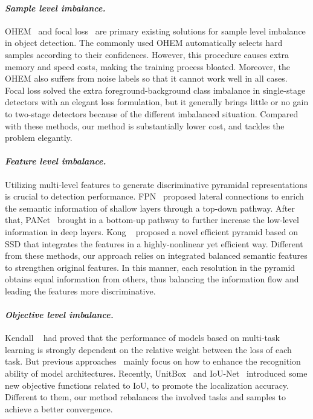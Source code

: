 \documentclass[10pt,twocolumn,letterpaper]{article}
\begin{document}
\paragraph{\emph{{Sample level imbalance.}}}
OHEM~\cite{ohem} and focal loss~\cite{focalloss} are primary existing solutions for sample level imbalance in object detection.
The commonly used OHEM automatically selects hard samples according to their confidences.
However, this procedure causes extra memory and speed costs, making the training process bloated.
Moreover, the OHEM also suffers from noise labels so that it cannot work well in all cases.
Focal loss solved the extra foreground-background class imbalance in single-stage detectors with an elegant loss formulation,
but it generally brings little or no gain to two-stage detectors because of the different imbalanced situation.
Compared with these methods, our method is substantially lower cost, and tackles the problem elegantly.

\vspace{-14pt}
\paragraph{\emph{{Feature level imbalance.}}}
Utilizing multi-level features to generate discriminative pyramidal representations is crucial to detection performance.
FPN~\cite{fpn} proposed lateral connections to enrich the semantic information of shallow layers through a top-down pathway.
After that, PANet~\cite{panet} brought in a bottom-up pathway to further increase the low-level information in deep layers.
Kong \etal~\cite{kong2018deep} proposed a novel efficient pyramid based on SSD that integrates the features in a highly-nonlinear yet efficient way.
Different from these methods, our approach relies on integrated balanced semantic features to strengthen original features.
In this manner, each resolution in the pyramid obtains equal information from others, thus balancing the information flow and leading the features more discriminative.

\vspace{-14pt}
\paragraph{\emph{{Objective level imbalance.}}}
Kendall \etal ~\cite{kendall2017multi} had proved that the performance of models based on multi-task learning is strongly dependent on the relative weight between the loss of each task.
But previous approaches~\cite{frcnn, fpn, focalloss} mainly focus on how to enhance the recognition ability of model architectures.
Recently, UnitBox~\cite{unitbox} and IoU-Net~\cite{iounet} introduced some new objective functions related to IoU, to promote the localization accuracy.
Different to them, our method rebalances the involved tasks and samples to achieve a better convergence.
\end{document}
